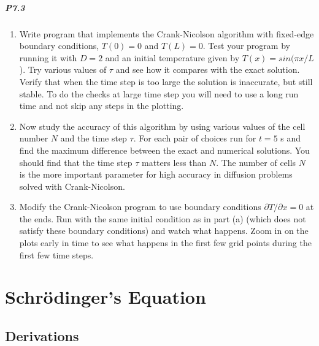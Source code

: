 \documentclass{book}
\theoremstyle{plain}
\theoremstyle{definition}
\numberwithin{exm}{chapter}
\theoremstyle{remark}
\theoremstyle{summary}
\theoremstyle{overview}
\begin{document}
\paragraph*{P7.3}
\begin{enumerate}[label=(\alph*)]
\item Write program that implements the Crank-Nicolson algorithm with
fixed-edge boundary conditions, $T(0) = 0$ and $T(L) = 0$. Test your
program by running it with $D = 2$ and an initial temperature given
by $T (x) = sin(\pi x/L$). Try various values of $\tau$ and see how it compares
with the exact solution. Verify that when the time step is too large the
solution is inaccurate, but still stable. To do the checks at large time
step you will need to use a long run time and not skip any steps in the
plotting.
\item  Now study the accuracy of this algorithm by using various values of
the cell number $N$ and the time step $\tau$. For each pair of choices run
for $t = 5$ s and find the maximum difference between the exact and
numerical solutions. You should find that the time step $\tau$ matters less
than $N$. The number of cells $N$ is the more important parameter for
high accuracy in diffusion problems solved with Crank-Nicolson.

\item Modify the Crank-Nicolson program to use boundary conditions
$ \partial T /\partial x = 0$ at the ends. Run with the same initial condition as in
part (a) (which does not satisfy these boundary conditions) and watch
what happens. Zoom in on the plots early in time to see what happens
in the first few grid points during the first few time steps.
\end{enumerate}

\chapter*{Schr{\"o}dinger\rq s Equation}
\section*{Derivations}
\end{document}
